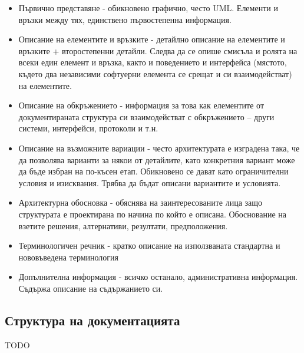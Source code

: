 \documentclass[fleqn,12pt]{article}
\begin{document}
\begin{itemize}
\item Първично представяне -  обикновено графично, често UML. Елементи и връзки между тях, единствено първостепенна информация.
\item Описание на елементите и връзките - детайлно описание на елементите и връзките + второстепенни детайли. Следва да се опише смисъла и ролята на всеки един елемент и връзка, както и поведението и интерфейса (мястото, където два независими софтуерни елемента се срещат и си взаимодействат)  на елементите.
\item Описание на обкръжението - информация за това как елементите от документираната структура си взаимодействат с обкръжението – други системи, интерфейси, протоколи и т.н.
\item Описание на възможните вариации - често архитектурата е изградена така, че да позволява варианти за някои от детайлите, като конкретния вариант може да бъде избран на по-късен етап. Обикновено се дават като ограничителни условия и изисквания. Трябва да бъдат описани вариантите и условията.
\item Архитектурна обосновка - обяснява на заинтересованите лица защо структурата е проектирана по начина по който е описана. Обоснование на взетите решения, алтернативи, резултати, предположения.
\item Терминологичен речник - кратко описание на използваната стандартна и нововъведена терминология
\item Допълнителна информация - всичко останало, административна информация. Съдържа описание на съдържанието си.
\end{itemize}

\subsection{Структура на документацията}
TODO
\end{document}
